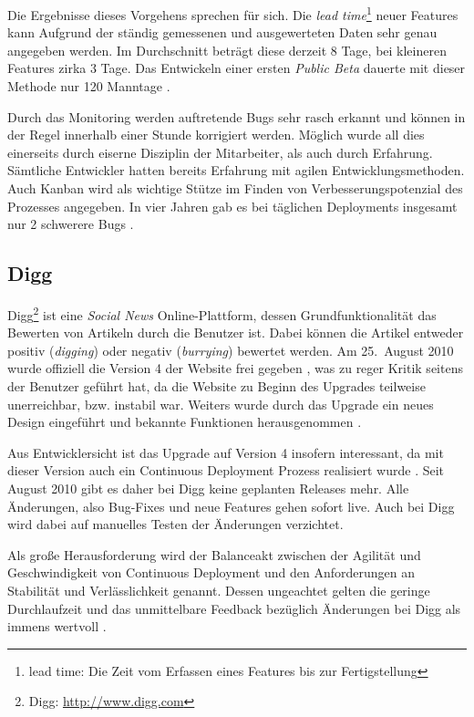 Die Ergebnisse dieses Vorgehens sprechen für sich. Die \emph{lead
time}\footnote{lead time: Die Zeit vom Erfassen eines Features bis zur
Fertigstellung} neuer Features kann Aufgrund der ständig gemessenen und
ausgewerteten Daten sehr genau angegeben werden. Im Durchschnitt beträgt diese
derzeit 8 Tage, bei kleineren Features zirka 3 Tage. Das Entwickeln einer
ersten \emph{Public Beta} dauerte mit dieser Methode nur 120 Manntage
\cite{Taipale2010}.

Durch das Monitoring werden auftretende Bugs sehr rasch erkannt und können in
der Regel innerhalb einer Stunde korrigiert werden. Möglich wurde all dies
einerseits durch eiserne Disziplin der Mitarbeiter, als auch durch Erfahrung.
Sämtliche Entwickler hatten bereits Erfahrung mit agilen Entwicklungsmethoden.
Auch Kanban wird als wichtige Stütze im Finden von Verbesserungspotenzial des
Prozesses angegeben. In vier Jahren gab es bei täglichen Deployments insgesamt
nur 2 schwerere Bugs \cite{Taipale2010}.


\subsection{Digg}

Digg\footnote{Digg: \url{http://www.digg.com}} ist eine \emph{Social News}
Online-Plattform, dessen Grundfunktionalität das Bewerten von Artikeln durch
die Benutzer ist. Dabei können die Artikel entweder positiv (\emph{digging})
oder negativ (\emph{burrying}) bewertet werden. Am 25.~August 2010 wurde
offiziell die Version 4 der Website frei gegeben \cite{digg4-launch}, was zu
reger Kritik seitens der Benutzer geführt hat, da die Website zu Beginn des
Upgrades teilweise unerreichbar, bzw. instabil war. Weiters wurde durch das
Upgrade ein neues Design eingeführt und bekannte Funktionen herausgenommen
\cite{digg4-critics}.

Aus Entwicklersicht ist das Upgrade auf Version 4 insofern interessant, da mit
dieser Version auch ein Continuous Deployment Prozess realisiert wurde
\cite{digg4}. Seit August 2010 gibt es daher bei Digg keine geplanten Releases
mehr. Alle Änderungen, also Bug-Fixes und neue Features gehen sofort live.
Auch bei Digg wird dabei auf manuelles Testen der Änderungen verzichtet.

Als große Herausforderung wird der Balanceakt zwischen der Agilität und
Geschwindigkeit von Continuous Deployment und den Anforderungen an Stabilität
und Verlässlichkeit genannt. Dessen ungeachtet gelten die geringe
Durchlaufzeit und das unmittelbare Feedback bezüglich Änderungen bei Digg als
immens wertvoll \cite{digg4}.

